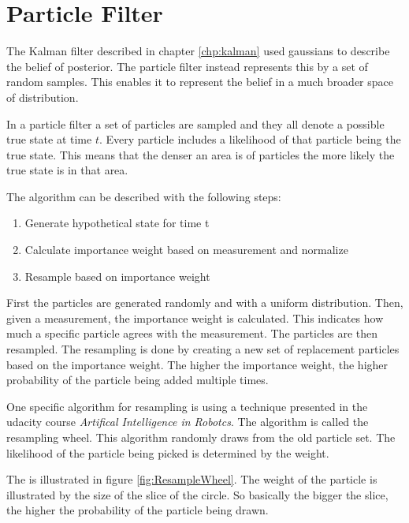 \chapter{Particle Filter}
\label{chp:partFilter}

The Kalman filter described in chapter \ref{chp:kalman} used gaussians to describe the belief of posterior. The particle filter instead represents this by a set of random samples. This enables it to represent the belief in a much broader space of distribution.

In a particle filter a set of particles are sampled and they all denote a possible true state at time $t$. Every particle includes a likelihood of that particle being the true state. This means that the denser an area is of particles the more likely the true state is in that area.

The algorithm can be described with the following steps:
\begin{enumerate}
	\item Generate hypothetical state for time t 
	\item Calculate importance weight based on measurement and normalize
	\item Resample based on importance weight
\end{enumerate}

First the particles are generated randomly and with a uniform distribution. Then, given a measurement, the importance weight is calculated. This indicates how much a specific particle agrees with the measurement. The particles are then resampled. The resampling is done by creating a new set of replacement particles based on the importance weight. The higher the importance weight, the higher probability of the particle being added multiple times.

One specific algorithm for resampling is using a technique presented in the udacity course \emph{Artifical Intelligence in Robotcs}\citep{udacity}. The algorithm is called the resampling wheel. This algorithm randomly draws from the old particle set. The likelihood of the particle being picked is determined by the weight.



The is illustrated in figure \ref{fig:ResampleWheel}. The weight of the particle is illustrated by the size of the slice of the circle. So basically the bigger the slice, the higher the probability of the particle being drawn.

